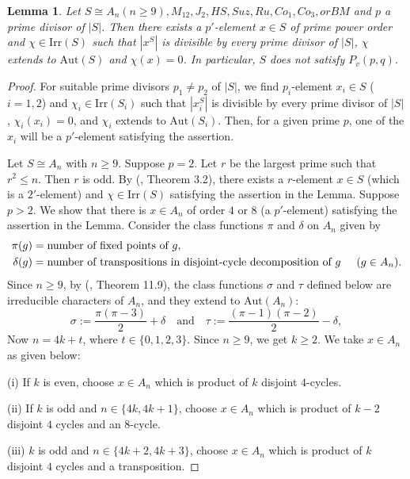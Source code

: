 \documentclass[11pt, a4paper]{article}
\numberwithin{equation}{section}
\theoremstyle{plain} %
\newtheorem{lemma}[theorem]{Lemma}
\begin{document}
\begin{lemma}\label{lem_alt}
Let $S\cong A_n (n\geq 9), M_{12}, J_2, HS, Suz, Ru, Co_1, Co_3, or BM$  and $p$ a prime divisor of $|S|$. Then there exists a $p'$-element $x\in S$ of prime power order and $\chi\in\mathrm{Irr}(S)$ such that $|x^S|$ is divisible by every prime divisor of $|S|$, $\chi$  extends to $\mathrm{Aut}(S)$ and $\chi(x)=0$. In particular, $S$ does not satisfy $P_v(p,q)$. 
\end{lemma}

\begin{proof} 
For suitable prime divisors $p_1\neq p_2$ of $|S|$, we find $p_i$-element $x_i\in S$ ($i=1,2$) and $\chi_i\in\mbox{Irr}(S_i)$ such that $|x_i^S|$ is divisible by every prime divisor of $|S|$, $\chi_i(x_i)=0$, and $\chi_i$ extends to $\mbox{Aut}(S_i)$. Then, for a given prime $p$, one of the $x_i$ will be a $p'$-element satisfying the assertion.

\vskip2mm 

Let $S\cong A_n$ with $n\ge 9$. Suppose $p=2$. Let $r$ be the largest prime such that $r^2\le n$. Then $r$ is odd. By (\cite{Arora03092025}, Theorem 3.2), there exists a $r$-element $x\in S$ (which is a $2'$-element) and $\chi\in\mbox{Irr}(S)$ satisfying the assertion in the Lemma.
Suppose $p>2$. We show that there is $x\in A_n$ of order $4$ or $8$ (a $p'$-element) satisfying the assertion in the Lemma.  Consider the class functions $\pi$ and $\delta$ on $A_n$ given by 
\begin{align*}
\pi(g) & =\mbox{number of fixed points of } g,\\
\delta(g) & = \mbox{number of transpositions in disjoint-cycle decomposition of } g \hskip5mm (g\in A_n).
\end{align*}
Since $n\ge 9$, by (\cite{MR1645304}, Theorem 11.9),  the class functions $\sigma$ and $\tau$ defined below are irreducible characters of $A_n$, and they extend to $\mbox{Aut}(A_n)$: 
$$
\sigma:=\frac{\pi(\pi-3)}{2}+\delta
\quad \text{and} \quad
\tau:=\frac{(\pi-1)(\pi-2)}{2}-\delta,
$$
Now $n=4k+t$, where $t\in\{0,1,2,3\}$. Since $n\ge 9$, we get $k\ge 2$. We take $x\in A_n$ as given below: 

(i) If $k$ is even, choose $x\in A_n$ which is product of $k$ disjoint $4$-cycles. 

(ii) If $k$ is odd and $n\in \{4k, 4k+1\}$, choose $x\in A_n$ which is product of $k-2$ disjoint  $4$ cycles and an $8$-cycle.  

(iii) $k$ is odd and $n\in \{4k+2, 4k+3\}$, choose $x\in A_n$ which is product of $k$ disjoint $4$ cycles and a transposition. 


\end{proof}
\end{document}
